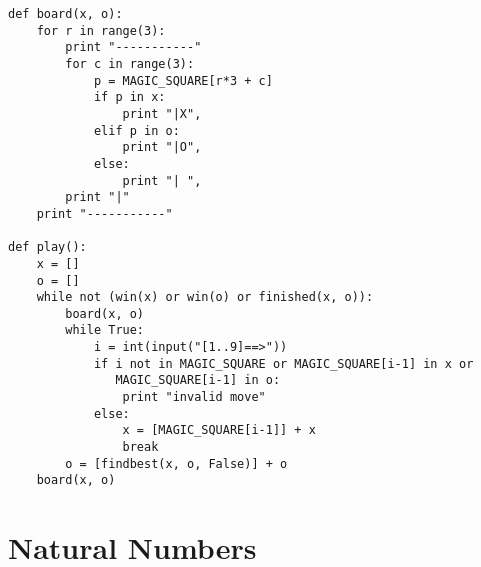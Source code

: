 \documentclass[UTF8]{article}
\begin{document}
\begin{enumerate}
\begin{lstlisting}
def board(x, o):
    for r in range(3):
        print "-----------"
        for c in range(3):
            p = MAGIC_SQUARE[r*3 + c]
            if p in x:
                print "|X",
            elif p in o:
                print "|O",
            else:
                print "| ",
        print "|"
    print "-----------"

def play():
    x = []
    o = []
    while not (win(x) or win(o) or finished(x, o)):
        board(x, o)
        while True:
            i = int(input("[1..9]==>"))
            if i not in MAGIC_SQUARE or MAGIC_SQUARE[i-1] in x or
               MAGIC_SQUARE[i-1] in o:
                print "invalid move"
            else:
                x = [MAGIC_SQUARE[i-1]] + x
                break
        o = [findbest(x, o, False)] + o
    board(x, o)
\end{lstlisting}

\end{enumerate}

\section{Natural Numbers}
\end{document}
